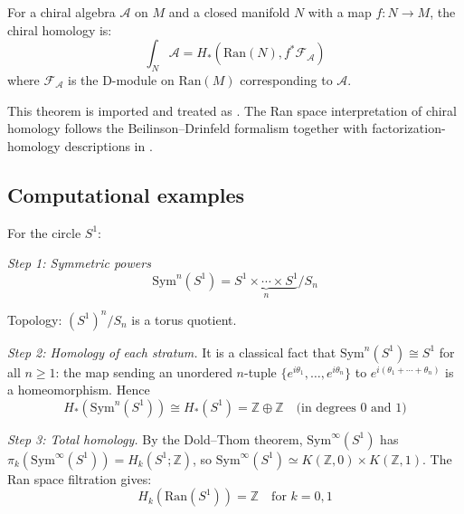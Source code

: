 \begin{theorem}
\label{thm:chiral-homology-ran}
For a chiral algebra $\mathcal{A}$ on $M$ and a closed manifold $N$ with a map 
$f: N \to M$, the chiral homology is:
\[\int_N \mathcal{A} = H_*(\text{Ran}(N), f^* \mathcal{F}_{\mathcal{A}})\]
where $\mathcal{F}_{\mathcal{A}}$ is the D-module on $\text{Ran}(M)$ corresponding 
to $\mathcal{A}$.
\end{theorem}

\begin{remark}
This theorem is imported and treated as \ClaimStatusProvedElsewhere. The Ran
space interpretation of chiral homology follows the Beilinson--Drinfeld
formalism \cite[Chapter~3]{BD04} together with factorization-homology
descriptions in \cite{CG17,AF15}.
\end{remark}

\subsection{Computational examples}

\begin{example}
\label{ex:homology-ran-S1}
For the circle $S^1$:

\emph{Step 1: Symmetric powers}
\[\text{Sym}^n(S^1) = \underbrace{S^1 \times \cdots \times S^1}_{n}/S_n\]

Topology: $(S^1)^n/S_n$ is a torus quotient.

\emph{Step 2: Homology of each stratum.}
It is a classical fact that $\text{Sym}^n(S^1) \cong S^1$ for all $n \geq 1$: the map
sending an unordered $n$-tuple $\{e^{i\theta_1}, \ldots, e^{i\theta_n}\}$ to $e^{i(\theta_1 + \cdots + \theta_n)}$
is a homeomorphism.  Hence
\[H_*(\text{Sym}^n(S^1)) \cong H_*(S^1) = \mathbb{Z} \oplus \mathbb{Z} \quad
   \text{(in degrees 0 and 1)}\]

\emph{Step 3: Total homology.}
By the Dold--Thom theorem, $\text{Sym}^\infty(S^1)$ has $\pi_k(\text{Sym}^\infty(S^1)) = H_k(S^1; \mathbb{Z})$, so $\text{Sym}^\infty(S^1) \simeq K(\mathbb{Z},0) \times K(\mathbb{Z},1)$.  The Ran space filtration gives:
\[H_k(\text{Ran}(S^1)) = \mathbb{Z} \quad \text{for } k = 0, 1\]
\end{example}

